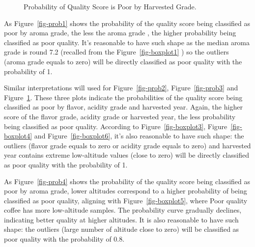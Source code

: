 \documentclass[
  letterpaper,
  DIV=11,
  numbers=noendperiod]{scrartcl}
\begin{document}
\begin{figure}[H]


\caption{\label{fig-prob5}Probability of Quality Score is Poor by
Harvested Grade.}

\end{figure}%

As Figure~\ref{fig-prob1} shows the probability of the quality score
being classified as poor by aroma grade, the less the aroma grade , the
higher probability being classified as poor quality. It's reasonable to
have such shape as the median aroma grade is round 7.2 (recalled from
the Figure~\ref{fig-boxplot1} ) so the outliers (aroma grade equals to
zero) will be directly classified as poor quality with the probability
of 1.

Similar interpretations will used for Figure~\ref{fig-prob2},
Figure~\ref{fig-prob3} and Figure~\ref{fig-prob5}. These three plots
indicate the probabilities of the quality score being classified as poor
by flavor, acidity grade and harvested year. Again, the higher score of
the flavor grade, acidity grade or harvested year, the less probability
being classified as poor quality. According to
Figure~\ref{fig-boxplot3}, Figure~\ref{fig-boxplot4} and
Figure~\ref{fig-boxplot6}, it's also reasonable to have such shape: the
outliers (flavor grade equals to zero or acidity grade equals to zero)
and harvested year contains extreme low-altitude values (close to zero)
will be directly classified as poor quality with the probability of 1.

As Figure~\ref{fig-prob4} shows the probability of the quality score
being classified as poor by aroma grade, lower altitudes correspond to a
higher probability of being classified as poor quality, aligning with
Figure~\ref{fig-boxplot5}, where Poor quality coffee has more
low-altitude samples. The probability curve gradually declines,
indicating better quality at higher altitudes. It is also reasonable to
have such shape: the outliers (large number of altitude close to zero)
will be classified as poor quality with the probability of 0.8.
\end{document}
